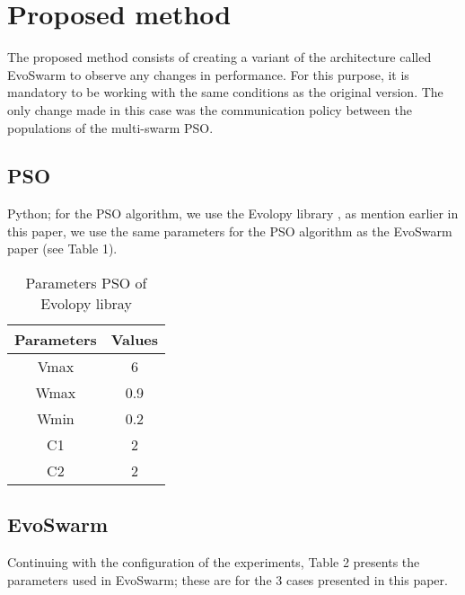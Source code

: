 \documentclass[runningheads]{llncs}
\begin{document}
\section{Proposed method}

The proposed method consists of creating a variant of the architecture called
EvoSwarm to observe any changes in performance. For this purpose, it is
mandatory to be working with the same conditions as the original version. The
only change made in this case was the communication policy between the
populations of the multi-swarm PSO.

\subsection{PSO} 


Python; for the PSO algorithm, we use the Evolopy library \cite{b19}, as mention
earlier in this paper, we use the same parameters for the PSO algorithm as the
EvoSwarm paper (see Table 1).

\begin{table}[h!]
\centering
\caption{Parameters PSO of Evolopy libray}
\begin{tabular}{|c c|} 
 \hline
 Parameters & Values  \\ [0.5ex] 
 \hline\hline
 Vmax & 6 \\ 
 Wmax & 0.9 \\
 Wmin & 0.2 \\
C1 & 2 \\
C2 & 2 \\[0.5ex]
 \hline
\end{tabular}
\label{table:1}
\end{table}

\subsection{EvoSwarm} 

Continuing with the configuration of the experiments, Table 2 presents the
parameters used in EvoSwarm; these are for the 3 cases presented in this paper.

\begin{table}[h]
\centering
\caption{Parameters for EvoSwarm}
\label{table:1}
\end{table}
\end{document}
